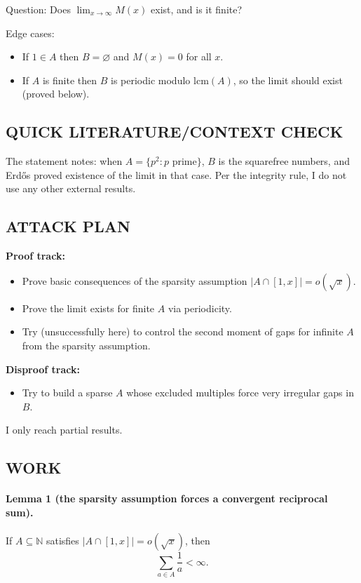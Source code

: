 Question: Does $\lim_{x\to\infty} M(x)$ exist, and is it finite?

Edge cases:
\begin{itemize}
\item If $1\in A$ then $B=\varnothing$ and $M(x)=0$ for all $x$.
\item If $A$ is finite then $B$ is periodic modulo $\mathrm{lcm}(A)$, so the limit should exist (proved below).
\end{itemize}

\subsection*{QUICK LITERATURE/CONTEXT CHECK}
The statement notes: when $A=\{p^2: p\text{ prime}\}$, $B$ is the squarefree numbers, and Erd\H{o}s proved existence of the limit in that case.
Per the integrity rule, I do not use any other external results.

\subsection*{ATTACK PLAN}
\textbf{Proof track:}
\begin{itemize}
\item Prove basic consequences of the sparsity assumption $|A\cap[1,x]|=o(\sqrt x)$.
\item Prove the limit exists for finite $A$ via periodicity.
\item Try (unsuccessfully here) to control the second moment of gaps for infinite $A$ from the sparsity assumption.
\end{itemize}
\textbf{Disproof track:}
\begin{itemize}
\item Try to build a sparse $A$ whose excluded multiples force very irregular gaps in $B$.
\end{itemize}
I only reach partial results.

\subsection*{WORK}
\paragraph{Lemma 1 (the sparsity assumption forces a convergent reciprocal sum).}
If $A\subseteq\mathbb{N}$ satisfies $|A\cap[1,x]|=o(\sqrt x)$, then
\[\sum_{a\in A}\frac{1}{a}<\infty.
\]

